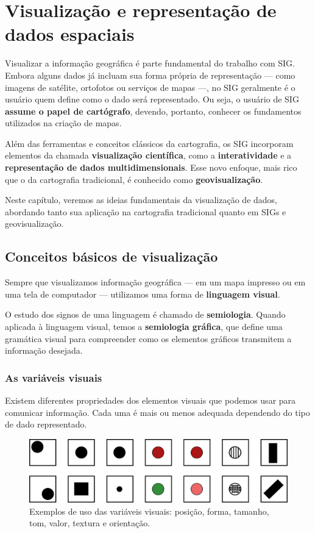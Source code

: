 \chapter{Visualização e representação de dados espaciais}

\pagestyle{fancy}

Visualizar a informação geográfica é parte fundamental do trabalho com SIG. Embora alguns dados já incluam sua forma própria de representação — como imagens de satélite, ortofotos ou serviços de mapas —, no SIG geralmente é o usuário quem define como o dado será representado. Ou seja, o usuário de SIG \textbf{assume o papel de cartógrafo}, devendo, portanto, conhecer os fundamentos utilizados na criação de mapas.

Além das ferramentas e conceitos clássicos da cartografia, os SIG incorporam elementos da chamada \textbf{visualização científica}, como a \textbf{interatividade} e a \textbf{representação de dados multidimensionais}. Esse novo enfoque, mais rico que o da cartografia tradicional, é conhecido como \textbf{geovisualização}.

Neste capítulo, veremos as ideias fundamentais da visualização de dados, abordando tanto sua aplicação na cartografia tradicional quanto em SIGs e geovisualização.

\section{Conceitos básicos de visualização}

Sempre que visualizamos informação geográfica — em um mapa impresso ou em uma tela de computador — utilizamos uma forma de \textbf{linguagem visual}.

O estudo dos signos de uma linguagem é chamado de \textbf{semiologia}. Quando aplicada à linguagem visual, temos a \textbf{semiologia gráfica}, que define uma gramática visual para compreender como os elementos gráficos transmitem a informação desejada.

\subsection{As variáveis visuais}

Existem diferentes propriedades dos elementos visuais que podemos usar para comunicar informação. Cada uma é mais ou menos adequada dependendo do tipo de dado representado.

\begin{figure}[!hbt]
\centering
\includegraphics[width=\columnwidth]{Visualizacao/VariablesVisuales.pdf}
\caption{\small Exemplos de uso das variáveis visuais: posição, forma, tamanho, tom, valor, textura e orientação.}
\label{Fig:VariablesVisuales} 
\end{figure}

